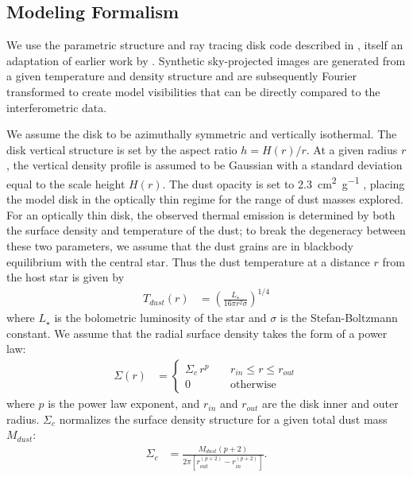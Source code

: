\documentclass[modern]{aastex62}
\begin{document}
\subsection{Modeling Formalism}

We use the parametric structure and ray tracing disk code described in \cite{flaherty15}, itself an adaptation of earlier work by \cite{rosenfeld13}.
Synthetic sky-projected images are generated from a given temperature and density structure and are subsequently Fourier transformed to create model visibilities that can be directly compared to the interferometric data.

We assume the disk to be azimuthally symmetric and vertically isothermal. 
The disk vertical structure is set by the aspect ratio $h = H(r)/r$. 
At a given radius $r$, the vertical density profile is assumed to be Gaussian with a standard deviation equal to the scale height $H(r)$.
The dust opacity is set to \SI{2.3}{\cm^2.\gram^{-1}} \citep{beckwith90}, placing the model disk in the optically thin regime for the range of dust masses explored.
For an optically thin disk, the observed thermal emission is determined by both the surface density and temperature of the dust; to break the degeneracy between these two parameters, we assume that the dust grains are in blackbody equilibrium with the central star.
Thus the dust temperature at a distance $r$ from the host star is given by
\begin{align}
  T_{dust} (r) &= \left( \frac{L_{\star}}{16 \pi r^2 \sigma} \right)^{1/4}
\end{align}
where $L_{\star}$ is the bolometric luminosity of the star and $\sigma$ is the Stefan-Boltzmann constant. We assume that the radial surface density takes the form of a power law: 
\begin{align}
  \Sigma(r) &= 
  \begin{cases}
    \Sigma_c \, r^{p} \; \; \; \; & r_{in} \leq r \leq r_{out} \\
    0 \; \; \; \; &\mbox{otherwise} 
  \end{cases}
\end{align}
where $p$ is the power law exponent, and $r_{in}$ and $r_{out}$ are the disk inner and outer radius. 
$\Sigma_c$ normalizes the surface density structure for a given total dust mass $M_{dust}$:
\begin{align}
\Sigma_c &= \frac{M_{dust} \left(p + 2 \right)}{2 \pi \left[ r_{out}^{(p+2)} - r_{in}^{(p+2)} \right]}.
\end{align}
\end{document}
